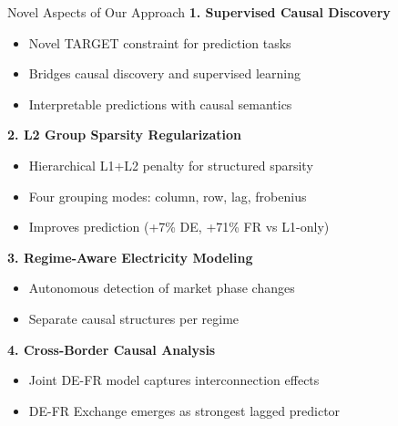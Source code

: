 \documentclass[aspectratio=169]{beamer}
\begin{document}
\begin{frame}{Novel Aspects of Our Approach}
\textbf{1. Supervised Causal Discovery}
\begin{itemize}
    \item Novel TARGET constraint for prediction tasks
    \item Bridges causal discovery and supervised learning
    \item Interpretable predictions with causal semantics
\end{itemize}

\textbf{2. L2 Group Sparsity Regularization}
\begin{itemize}
    \item Hierarchical L1+L2 penalty for structured sparsity
    \item Four grouping modes: column, row, lag, frobenius
    \item Improves prediction (+7\% DE, +71\% FR vs L1-only)
\end{itemize}

\textbf{3. Regime-Aware Electricity Modeling}
\begin{itemize}
    \item Autonomous detection of market phase changes
    \item Separate causal structures per regime
\end{itemize}

\textbf{4. Cross-Border Causal Analysis}
\begin{itemize}
    \item Joint DE-FR model captures interconnection effects
    \item DE-FR Exchange emerges as strongest lagged predictor
\end{itemize}
\end{frame}
\end{document}

